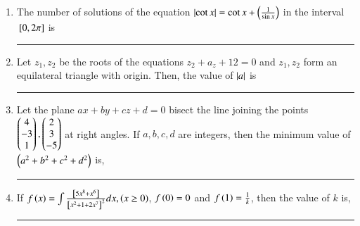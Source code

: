 \documentclass[journal]{IEEEtran}
\begin{document}
\begin{enumerate}
\begin{figure}[H]
			\label{stemplot}
		\end{figure}
	\item The number of solutions of the equation $\left\vert\cot x\right\vert=\cot x +\left(\frac{1}{\sin x}\right)$ in the interval ${}\left[0, 2\pi\right]$ is\rule{2cm}{0.1pt}
	\item Let $z_1,z_2$ be the roots of the equations $z_2+a_z+12=0$ and $z_1,z_2$ form an equilateral triangle with origin. Then, the value of $\left\vert a\right\vert$ is \rule{2cm}{0.1pt}
	\item Let the plane $ax+by+cz+d=0$ bisect the line joining the points $\begin{pmatrix}4\\-3\\1\end{pmatrix},\begin{pmatrix}2\\3\\-5\end{pmatrix}$ at right angles. If $a,b,c,d$ are integers, then the minimum value of $\left(a^2+b^2+c^2+d^2\right)$ is,\rule{2cm}{0.1pt}
	\item If $f\left(x\right)=\int\frac{{}\left[5x^8+x^6\right]}{{}\left[x^2+1+2x^7\right]^2}dx, \left(x\ge0\right)$, $f\left(0\right)=0$ and $f\left(1\right)=\frac{1}{k}$, then the value of $k$ is, \rule{2cm}{0.1pt}
\end{enumerate}
\end{document}
